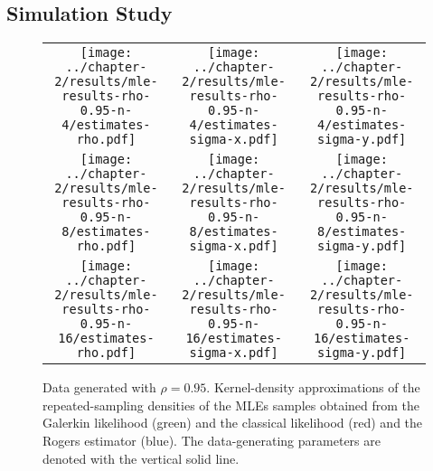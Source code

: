 \subsection{Simulation Study} \label{sec:simulation-study}
\begin{figure}
  \centering
  \begin{tabular}{ccc}
    \begin{minipage}{0.3\textwidth}
      \centering
      \texttt{[image: ../chapter-2/results/mle-results-rho-0.95-n-4/estimates-rho.pdf]}
    \end{minipage}
    & \begin{minipage}{0.3\textwidth}
      \centering
      \texttt{[image: ../chapter-2/results/mle-results-rho-0.95-n-4/estimates-sigma-x.pdf]}
    \end{minipage}
    & \begin{minipage}{0.3\textwidth}
      \centering
      \texttt{[image: ../chapter-2/results/mle-results-rho-0.95-n-4/estimates-sigma-y.pdf]}
    \end{minipage} \\
    \begin{minipage}{0.3\textwidth}
      \centering
      \texttt{[image: ../chapter-2/results/mle-results-rho-0.95-n-8/estimates-rho.pdf]}
    \end{minipage}
    & \begin{minipage}{0.3\textwidth}
      \centering
      \texttt{[image: ../chapter-2/results/mle-results-rho-0.95-n-8/estimates-sigma-x.pdf]}
    \end{minipage}
    & \begin{minipage}{0.3\textwidth}
      \centering
      \texttt{[image: ../chapter-2/results/mle-results-rho-0.95-n-8/estimates-sigma-y.pdf]}
    \end{minipage} \\
    \begin{minipage}{0.3\textwidth}
      \centering
      \texttt{[image: ../chapter-2/results/mle-results-rho-0.95-n-16/estimates-rho.pdf]}
    \end{minipage}
    & \begin{minipage}{0.3\textwidth}
      \centering
      \texttt{[image: ../chapter-2/results/mle-results-rho-0.95-n-16/estimates-sigma-x.pdf]}
    \end{minipage}
    & \begin{minipage}{0.3\textwidth}
      \centering
      \texttt{[image: ../chapter-2/results/mle-results-rho-0.95-n-16/estimates-sigma-y.pdf]}
    \end{minipage}
  \end{tabular}
  \caption{Data generated with $\rho=0.95$. Kernel-density
    approximations of the repeated-sampling densities of the MLEs
    samples obtained from the Galerkin likelihood (green) and the
    classical likelihood (red) and the Rogers estimator
    (blue). The data-generating parameters are denoted with the
    vertical solid line.}
  \label{fig:mle-comparison-rho-0.95}
\end{figure}

